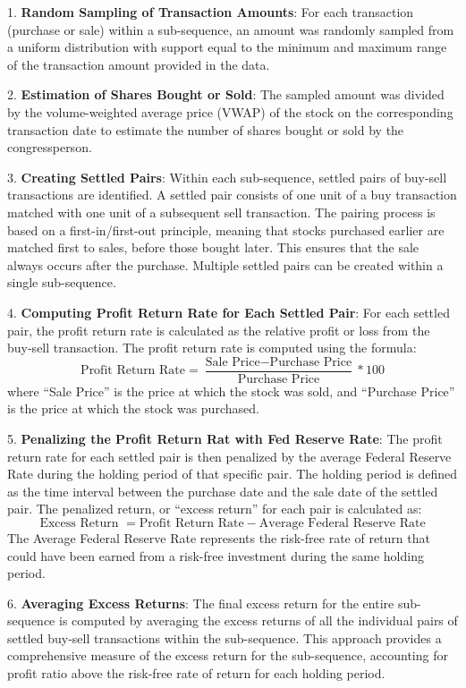 \documentclass[15pt,letterpaper]{article}
\begin{document}
1. \textbf{Random Sampling of Transaction Amounts}: For each transaction (purchase or sale) within a sub-sequence, an amount was randomly sampled from a uniform distribution with support equal to the minimum and maximum range of the transaction amount provided in the data.

2. \textbf{Estimation of Shares Bought or Sold}: The sampled amount was divided by the volume-weighted average price (VWAP) of the stock on the corresponding transaction date to estimate the number of shares bought or sold by the congressperson.

3. \textbf{Creating Settled Pairs}: Within each sub-sequence, settled pairs of buy-sell transactions are identified. A settled pair consists of one unit of a buy transaction matched with one unit of a subsequent sell transaction. The pairing process is based on a first-in/first-out principle, meaning that stocks purchased earlier are matched first to sales, before those bought later. This ensures that the sale always occurs after the purchase. Multiple settled pairs can be created within a single sub-sequence.

4. \textbf{Computing Profit Return Rate for Each Settled Pair}: For each settled pair, the profit return rate is calculated as the relative profit or loss from the buy-sell transaction. The profit return rate is computed using the formula:
\[ \text{Profit Return Rate} = \frac{\text{Sale Price} - \text{Purchase Price}}{\text{Purchase Price}} * 100\]
where ``Sale Price'' is the price at which the stock was sold, and ``Purchase Price'' is the price at which the stock was purchased.

5. \textbf{Penalizing the Profit Return Rat with Fed Reserve Rate}: The profit return rate for each settled pair is then penalized by the average Federal Reserve Rate during the holding period of that specific pair. The holding period is defined as the time interval between the purchase date and the sale date of the settled pair. The penalized return, or ``excess return'' for each pair is calculated as:
\[ \text{Excess Return } = \text{Profit Return Rate} - \text{Average Federal Reserve Rate} \]
The Average Federal Reserve Rate represents the risk-free rate of return that could have been earned from a risk-free investment during the same holding period.

6. \textbf{Averaging Excess Returns}: The final excess return for the entire sub-sequence is computed by averaging the excess returns of all the individual pairs of settled buy-sell transactions within the sub-sequence. This approach provides a comprehensive measure of the excess return for the sub-sequence, accounting for profit ratio above the risk-free rate of return for each holding period.
\end{document}
